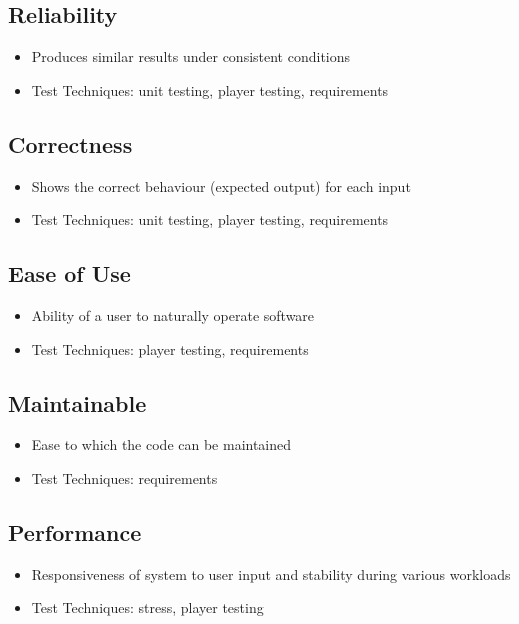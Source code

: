 \documentclass[12pt]{article}
\begin{document}
\subsection{Reliability}
\begin{itemize}
\item Produces similar results under consistent conditions
\item Test Techniques: unit testing, player testing, requirements
\end{itemize}

\subsection{Correctness}
\begin{itemize}
\item Shows the correct behaviour (expected output) for each input
\item Test Techniques: unit testing, player testing, requirements
\end{itemize}

\subsection{Ease of Use}
\begin{itemize}
\item Ability of a user to naturally operate software
\item Test Techniques: player testing, requirements
\end{itemize}

\subsection{Maintainable}
\begin{itemize}
\item Ease to which the code can be maintained
\item Test Techniques: requirements
\end{itemize}

\subsection{Performance}
\begin{itemize}
\item Responsiveness of system to user input and stability during various workloads
\item Test Techniques: stress, player testing
\end{itemize}
\end{document}
